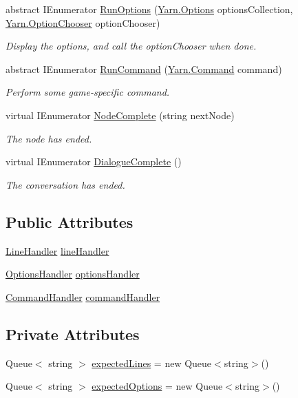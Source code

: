 \begin{DoxyCompactItemize}
abstract I\-Enumerator \hyperlink{a00095_ac5b29079f638f2ceb078627ef1e60004}{Run\-Options} (\hyperlink{a00051_a00380}{Yarn.\-Options} options\-Collection, \hyperlink{a00051_a39866cbb03c03a35805d598b5d4ad553}{Yarn.\-Option\-Chooser} option\-Chooser)
\begin{DoxyCompactList}\small\item\em Display the options, and call the option\-Chooser when done. \end{DoxyCompactList}\item 
abstract I\-Enumerator \hyperlink{a00095_a3dffe84b9e7a10fdec6749baf697d111}{Run\-Command} (\hyperlink{a00051_a00373}{Yarn.\-Command} command)
\begin{DoxyCompactList}\small\item\em Perform some game-\/specific command. \end{DoxyCompactList}\item 
virtual I\-Enumerator \hyperlink{a00095_a2900548a0704d39d4502a153945f4bef}{Node\-Complete} (string next\-Node)
\begin{DoxyCompactList}\small\item\em The node has ended. \end{DoxyCompactList}\item 
virtual I\-Enumerator \hyperlink{a00095_aecc60aee9e9386da1f71fb183f43c52d}{Dialogue\-Complete} ()
\begin{DoxyCompactList}\small\item\em The conversation has ended. \end{DoxyCompactList}\end{DoxyCompactItemize}
\subsection*{Public Attributes}
\begin{DoxyCompactItemize}
\item 
\hyperlink{a00171_ac6c30953edbd1cd4181e2a3854a1642b}{Line\-Handler} \hyperlink{a00171_af87332992e1420a8b2047822fab2b03c}{line\-Handler}
\item 
\hyperlink{a00171_a7fe2e6bc2d5471d9af14a9d35de821bd}{Options\-Handler} \hyperlink{a00171_adcbea72eb6f5ab305b3757789919f961}{options\-Handler}
\item 
\hyperlink{a00171_afc93c5cf370b31eceab3671c9eca0d94}{Command\-Handler} \hyperlink{a00171_a5c2003ece8aeab171db3a749bef5f770}{command\-Handler}
\end{DoxyCompactItemize}
\subsection*{Private Attributes}
\begin{DoxyCompactItemize}
\item 
Queue$<$ string $>$ \hyperlink{a00171_ab0f7b55e776ae494a651c845b496916c}{expected\-Lines} = new Queue$<$string$>$()
\item 
Queue$<$ string $>$ \hyperlink{a00171_a94e4308d412945c977b2deb63f139009}{expected\-Options} = new Queue$<$string$>$()
\end{DoxyCompactItemize}


